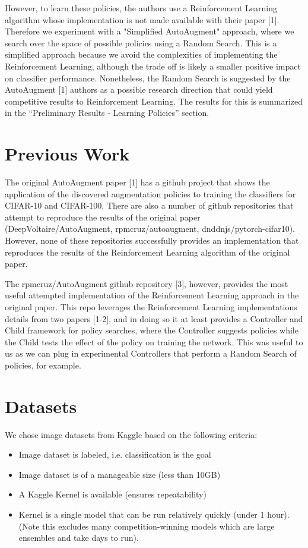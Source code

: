 \documentclass[10pt,twocolumn,letterpaper]{article}
\begin{document}
However, to learn these policies, the authors use a Reinforcement Learning algorithm whose implementation is not made available with their paper [1].  Therefore we experiment with a "Simplified AutoAugment" approach, where we search over the space of possible policies using a Random Search.  This is a simplified approach because we avoid the complexities of implementing the Reinforcement Learning, although the trade off is likely a smaller positive impact on classifier performance.  Nonetheless, the Random Search is suggested by the AutoAugment [1] authors as a possible research direction that could yield competitive results to Reinforcement Learning. The results for this is summarized in the “Preliminary Results - Learning Policies” section.

\section{Previous Work}

The original AutoAugment paper [1] has a github project that shows the application of the discovered augmentation policies to training the classifiers for CIFAR-10 and CIFAR-100.  There are also a number of github repositories that attempt to reproduce the results of the original paper (DeepVoltaire/AutoAugment, rpmcruz/autoaugment, dnddnjs/pytorch-cifar10).  However, none of these repositories successfully provides an implementation that reproduces the results of the Reinforcement Learning algorithm of the original paper.

The rpmcruz/AutoAugment github repository [3], however, provides the most useful attempted implementation of the Reinforcement Learning approach in the original paper.  This repo leverages the Reinforcement Learning implementations details from two papers [1-2], and in doing so it at least provides a Controller and Child framework for policy searches, where the Controller suggests policies while the Child tests the effect of the policy on training the network.  This was useful to us as we can plug in experimental Controllers that perform a Random Search of policies, for example.

\section{Datasets}

We chose image datasets from Kaggle based on the following criteria:

\begin{itemize}
  \item Image dataset is labeled, i.e. classification is the goal
  \item Image dataset is of a manageable size (less than 10GB)
  \item A Kaggle Kernel is available (ensures repeatability)
  \item Kernel is a single model that can be run relatively quickly (under 1 hour).  (Note this excludes many competition-winning models which are large ensembles and take days to run).
\end{itemize}
\end{document}
